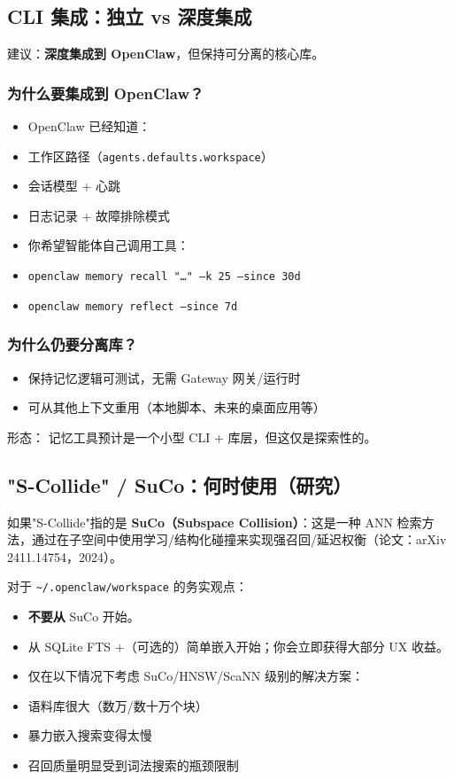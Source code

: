 \subsection{CLI 集成：独立 vs 深度集成}


建议：\textbf{深度集成到 OpenClaw}，但保持可分离的核心库。

\subsubsection{为什么要集成到 OpenClaw？}


\begin{itemize}
  \item OpenClaw 已经知道：
  \item 工作区路径（\texttt{agents.defaults.workspace}）
  \item 会话模型 + 心跳
  \item 日志记录 + 故障排除模式
  \item 你希望智能体自己调用工具：
  \item \texttt{openclaw memory recall "…" --k 25 --since 30d}
  \item \texttt{openclaw memory reflect --since 7d}
\end{itemize}


\subsubsection{为什么仍要分离库？}


\begin{itemize}
  \item 保持记忆逻辑可测试，无需 Gateway 网关/运行时
  \item 可从其他上下文重用（本地脚本、未来的桌面应用等）
\end{itemize}


形态：
记忆工具预计是一个小型 CLI + 库层，但这仅是探索性的。

\subsection{"S-Collide" / SuCo：何时使用（研究）}


如果"S-Collide"指的是 \textbf{SuCo（Subspace Collision）}：这是一种 ANN 检索方法，通过在子空间中使用学习/结构化碰撞来实现强召回/延迟权衡（论文：arXiv 2411.14754，2024）。

对于 \texttt{\textasciitilde{}/.openclaw/workspace} 的务实观点：

\begin{itemize}
  \item \textbf{不要从} SuCo 开始。
  \item 从 SQLite FTS +（可选的）简单嵌入开始；你会立即获得大部分 UX 收益。
  \item 仅在以下情况下考虑 SuCo/HNSW/ScaNN 级别的解决方案：
  \item 语料库很大（数万/数十万个块）
  \item 暴力嵌入搜索变得太慢
  \item 召回质量明显受到词法搜索的瓶颈限制
\end{itemize}


